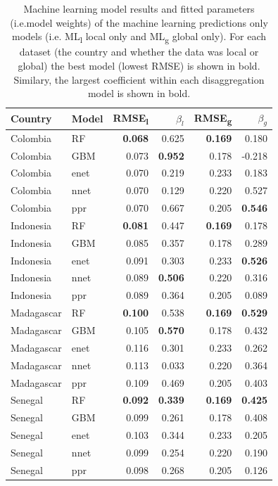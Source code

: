 \documentclass[review]{elsarticle}
\begin{document}
\begin{table}[t!]

\centering
\small
\begin{tabular}{ll|rr|rr}
     Country          & Model &      RMSE\textsubscript{l} & $\beta_l$ & RMSE\textsubscript{g} & $\beta_g$ \\ \hline
Colombia & RF & \textbf{0.068} & 0.625 &  \textbf{0.169} & 0.180\\
Colombia & GBM & 0.073 & \textbf{0.952} & 0.178& -0.218  \\
Colombia & enet & 0.070 & 0.219 &0.233 & 0.183 \\
Colombia & nnet & 0.070 & 0.129 &0.220 & 0.527 \\
Colombia & ppr & 0.070 & 0.667 & 0.205 &  \textbf{0.546}\vspace{0.3cm}\\
Indonesia & RF& \textbf{0.081} & 0.447 & \textbf{0.169} & 0.178\\
Indonesia & GBM & 0.085 & 0.357 & 0.178& 0.289 \\
Indonesia & enet & 0.091 & 0.303 &0.233 & \textbf{0.526} \\
Indonesia & nnet & 0.089 & \textbf{0.506} &0.220 & 0.316 \\
Indonesia & ppr & 0.089 & 0.364 & 0.205 &  0.089\vspace{0.3cm}\\
Madagascar & RF & \textbf{0.100} & 0.538 &  \textbf{0.169} & \textbf{0.529}\\
Madagascar & GBM & 0.105 & \textbf{0.570} & 0.178& 0.432 \\
Madagascar & enet & 0.116 & 0.301 &0.233 & 0.262 \\
Madagascar & nnet & 0.113 & 0.033 &0.220 & 0.364 \\
Madagascar & ppr & 0.109 & 0.469 & 0.205 &  0.403\vspace{0.3cm}\\ 
Senegal & RF & \textbf{0.092} & \textbf{0.339} & \textbf{0.169} & \textbf{0.425} \\
Senegal & GBM & 0.099 & 0.261& 0.178& 0.408 \\
Senegal & enet& 0.103 & 0.344  &0.233 & 0.205 \\
Senegal & nnet & 0.099 & 0.254 &0.220 & 0.190 \\
Senegal & ppr & 0.098 & 0.268& 0.205 &  0.126\\


\end{tabular}
\caption{Machine learning model results and fitted parameters (i.e.\thinspace model weights) of the machine learning predictions only models (i.e. ML\textsubscript{l} local only and ML\textsubscript{g} global only). 
  For each dataset (the country and whether the data was local or global) the best model (lowest RMSE) is shown in bold. 
  Similary, the largest coefficient within each disaggregation model is shown in bold.}
\label{t:mlresults}
\end{table}
\end{document}
